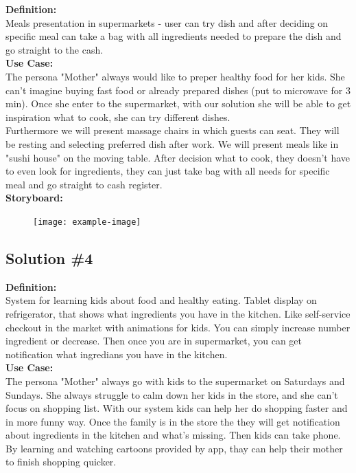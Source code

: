 \documentclass[a4paper,10pt,oneside]{scrreprt}
\begin{document}
		\noindent \textbf{Definition:}\\
			Meals presentation in supermarkets - user can try dish and after deciding on specific meal can take a bag with all ingredients needed to prepare the dish and go straight to the cash.\\

			\noindent \textbf{Use Case:}\\
			The persona "Mother" always would like to preper healthy food for her kids. She can't imagine buying fast food or
already prepared dishes (put to microwave for 3 min). Once she enter to the supermarket, with our solution she will
be able to get inspiration what to cook, she can try different dishes.\\

			Furthermore we will present massage chairs in which guests can seat. They will be resting and selecting preferred dish after work. We will present meals like in "sushi house" on the moving table. After decision what to cook, they doesn't have to
even look for ingredients, they can just take bag with all needs for specific meal and go straight to cash register.\\

			\noindent \textbf{Storyboard:}\\

			\begin{figure}[H]
				\centering
				\texttt{[image: example-image]}
			\end{figure}
		
		\clearpage

		\subsection{Solution \#4}

		\noindent \textbf{Definition:}\\
			System for learning kids about food and healthy eating. Tablet display on refrigerator, that shows what ingredients you have in the kitchen. Like self-service checkout in the market with animations for kids. You can simply increase number ingredient or decrease. Then once you are in supermarket, you can get notification what ingredians you have in the kitchen.\\

			\noindent \textbf{Use Case:}\\
			The persona "Mother" always go with kids to the supermarket on Saturdays and  Sundays. She always struggle to calm down her kids in the store, and she can't focus on shopping list. With our system kids can help her do shopping faster and in more funny way. Once the family is in the store the they will get notification about ingredients in the kitchen and what's missing. Then kids can take phone. By learning and watching cartoons provided by app, thay can help their mother to finish shopping quicker.\\
\end{document}
